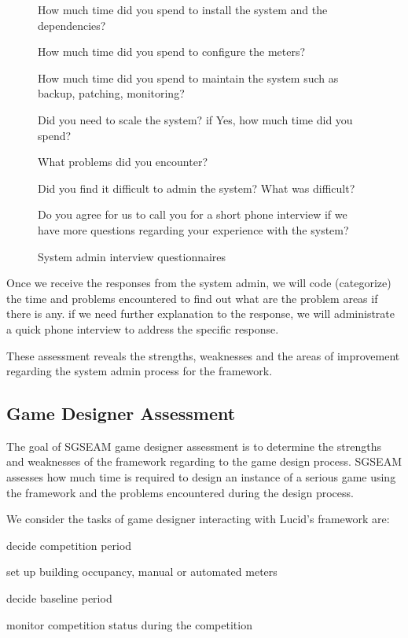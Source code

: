 \documentclass[11pt,oneside]{book}
\begin{document}
\begin{figure}[ht!]
\begin{mybox}
\begin{compactenum}
\item How much time did you spend to install the system and the dependencies?
\item How much time did you spend to configure the meters?
\item How much time did you spend to maintain the system such as backup, patching, monitoring?
\item Did you need to scale the system? if Yes, how much time did you spend?
\item What problems did you encounter?
\item Did you find it difficult to admin the system? What was difficult?
\item Do you agree for us to call you for a short phone interview if we have more questions regarding your experience with the system?
\end{compactenum}
\end{mybox}
\caption{System admin interview questionnaires}
\label{fig:system-admin-interview}  
\end{figure}

Once we receive the responses from the system admin, we will code (categorize) the time and problems encountered to find out what are the problem areas if there is any. if we need further explanation to the response, we will administrate a quick phone interview to address the specific response. 

These assessment reveals the strengths, weaknesses and the areas of improvement regarding the system admin process for the framework.

\subsection{Game Designer Assessment}

The goal of SGSEAM game designer assessment is to determine the strengths and weaknesses of the framework 
regarding to the game design process. SGSEAM 
assesses how much time is required to design an instance of a serious game using the framework and the problems encountered during the design process.

We consider the tasks of game designer interacting with Lucid's framework are:
\begin{compactenum}
    \item decide competition period
    \item set up building occupancy, manual or automated meters
    \item decide baseline period
    \item monitor competition status during the competition
\end{compactenum}
\end{document}
